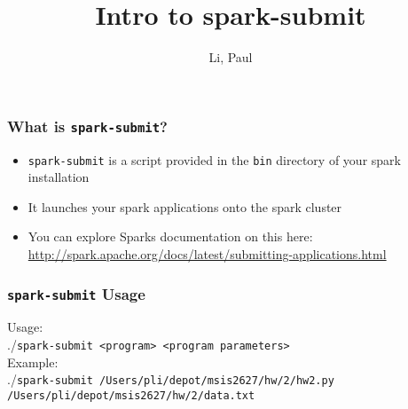 \documentclass{beamer}
\title{Intro to spark-submit}
\author{Li, Paul}
\begin{document}
\frame{\titlepage}
\begin{frame}
  \frametitle{What is \texttt{spark-submit}?}
  \begin{itemize}
    \item \texttt{spark-submit} is a script provided in the \texttt{bin} directory of
      your spark installation
    \item It launches your spark applications onto the spark cluster
    \item You can explore Sparks documentation on this here:
      \url{http://spark.apache.org/docs/latest/submitting-applications.html}
  \end{itemize}
\end{frame}

\begin{frame}
  \frametitle{\texttt{spark-submit} Usage}
  Usage: \\
  ./\texttt{spark-submit <program> <program parameters>} \\
  Example:\\
  \footnotesize
  ./\texttt{spark-submit /Users/pli/depot/msis2627/hw/2/hw2.py /Users/pli/depot/msis2627/hw/2/data.txt}\\
\end{frame}
\end{document}
